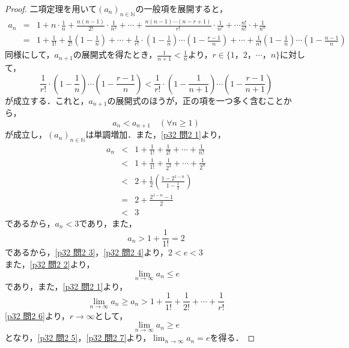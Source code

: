 \documentclass[dvipdfmx,uplatex,11pt]{jsarticle}
\theoremstyle{definition}
\begin{document}
\begin{leftbar}
	\begin{proof}
		二項定理を用いて$(a_n)_{n \in \mathbb{N}}$の一般項を展開すると，
		\begin{eqnarray}
			a_n & = & 1 + n \cdot \frac{1}{n} + \frac{n(n-1)}{2!} \cdot \frac{1}{n^2} + \cdots + \frac{n(n-1)\cdots(n-r+1)}{r!} \cdot \frac{1}{n^r} + \cdots \frac{n!}{n!} \cdot + \frac{1}{n^n} \nonumber  \\
			& = & 1+ \frac{1}{1!} + \frac{1}{2!} \left(1- \frac{1}{n} \right) + \cdots + \frac{1}{r!} \cdot  \left(1 - \frac{1}{n} \right) \cdots \left (1-\frac{r-1}{n} \right) + \cdots \nonumber +  \frac{1}{n!} \left(1 - \frac{1}{n} \right) \cdots \left(1- \frac{n-1}{n} \right) \label{p32 問2 1}
		\end{eqnarray}
		同様にして，$a_{n+1}$の展開式を得たとき，$ \frac{1}{n+1} < \frac{1}{n}$より，$r\in \{ 1，2，\cdots ，n\}$に対して，
		\begin{equation}
			\frac{1}{r!} \cdot  \left(1 - \frac{1}{n} \right) \cdots \left (1-\frac{r-1}{n} \right) < \frac{1}{r!} \cdot  \left(1 - \frac{1}{n+1} \right) \cdots \left (1-\frac{r-1}{n+1} \right)
		\end{equation}
		が成立する．これと，$a_{n+1}$の展開式のほうが，正の項を一つ多く含むことから，
		\begin{equation}
			a_{n} < a_{n+1} \quad (\forall n \ge 1)
		\end{equation}
		が成立し，$(a_n)_{n \in \mathbb{N}}$は単調増加．また，\eqref{p32 問2 1}より，
		\begin{eqnarray}
			\label{p32 問2 2}
			a_n &<& 1 + \frac{1}{1!} + \frac{1}{2!} + \cdots + \frac{1}{n!} \\
			& < & 1 + \frac{1}{1!} + \frac{1}{2^2} + \cdots + \frac{1}{2^n} \\
			& < & 2 + \frac{1}{2} \left( \frac{ 1 - 2^{1-n} }{ 1- \frac{1}{2} } \right)\\
			& = & 2+ \frac{2^{1-n} -1}{2} \\
			\label{p32 問2 3}
			& < & 3
		\end{eqnarray}
		であるから，$a_n < 3$であり，また，
		\begin{equation}
			\label{p32 問2 4}
			a_n > 1 + \frac{1}{1!} =2
		\end{equation}
		であるから，\eqref{p32 問2 3}，\eqref{p32 問2 4}より，$2<e<3$\\
		また，\eqref{p32 問2 2}より，
		\begin{equation}
			\label{p32 問2 5}
			\lim_{n \to \infty} a_n \le e
		\end{equation}
		であり，また，\eqref{p32 問2 1}より，
		\begin{equation}
			\label{p32 問2 6}
			\lim_{n \to \infty} a_n \ge a_n > 1 + \frac{1}{1!} + \frac{1}{2!} + \cdots + \frac{1}{r!}
		\end{equation}
		\eqref{p32 問2 6}より，$r \to \infty$として，
		\begin{equation}
			\label{p32 問2 7}
			\lim_{n \to \infty} a_n \ge e
		\end{equation}
		となり，\eqref{p32 問2 5}，\eqref{p32 問2 7}より，$\lim_{n \to \infty} a_n =e$を得る．
	\end{proof}
\end{leftbar}
\newpage
\end{document}
